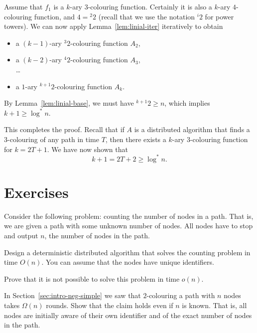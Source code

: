 Assume that $f_1$ is a $k$-ary $3$-colouring function. Certainly it is also a $k$-ary $4$-colouring function, and $4 = {}^2 2$ (recall that we use the notation ${}^i 2$ for power towers). We can now apply Lemma~\ref{lem:linial-iter} iteratively to obtain
\begin{itemize}[noitemsep]
    \item a $(k-1)$-ary ${}^3 2$-colouring function $A_2$,
    \item a $(k-2)$-ary ${}^4 2$-colouring function $A_3$, \\ \ldots
    \item a $1$-ary ${}^{k+1} 2$-colouring function $A_k$.
\end{itemize}
By Lemma~\ref{lem:linial-base}, we must have ${}^{k+1} 2 \ge n$, which implies $k + 1 \ge \log^* n$.

This completes the proof. Recall that if $A$ is a distributed algorithm that finds a $3$-colouring of any path in time $T$, then there exists a $k$-ary $3$-colouring function for $k = 2T+1$. We have now shown that
\[
    k + 1 = 2T + 2 \ge \log^* n.
\]


\section{Exercises}

\begin{ex}[counting]
    Consider the following problem: counting the number of nodes in a path. That is, we are given a path with some unknown number of nodes. All nodes have to stop and output $n$, the number of nodes in the path.
    \begin{subex}
        \item Design a deterministic distributed algorithm that solves the counting problem in time $O(n)$. You can assume that the nodes have unique identifiers.
        \item Prove that it is not possible to solve this problem in time $o(n)$.
    \end{subex}
\end{ex}

\begin{ex}[known $n$]
    In Section~\ref{sec:intro-neg-simple} we saw that $2$-colouring a path with $n$ nodes takes $\Omega(n)$    rounds. Show that the claim holds even if $n$ is known. That is, all nodes are initially aware of their own identifier and of the exact number of nodes in the path.
\end{ex}

